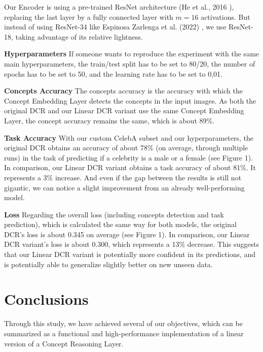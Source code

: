 \documentclass[sigconf, nonacm]{acmart}
\begin{document}
Our Encoder is using a pre-trained ResNet architecture (He et al., 2016 \cite{he2016residuallearning}), replacing the last layer by a fully connected layer with \( m = 16 \) activations. But instead of using ResNet-34 like Espinosa Zarlenga et al. (2022) \cite{espinosa2022concept}, we use ResNet-18, taking advantage of its relative lightness. \vspace{8pt}

\textbf{Hyperparameters} If someone wants to reproduce the experiment with the same main hyperparameters, the train/test split has to be set to 80/20, the number of epochs has to be set to 50, and the learning rate has to be set to 0,01. \vspace{8pt}

\textbf{Concepts Accuracy} The concepts accuracy is the accuracy with which the Concept Embedding Layer detects the concepts in the input images. As both the original DCR and our Linear DCR variant use the same Concept Embedding Layer, the concept accuracy remains the same, which is about 89\%. \vspace{8pt}

\textbf{Task Accuracy} With our custom CelebA subset and our hyperparameters, the original DCR obtains an accuracy of about 78\% (on average, through multiple runs) in the task of predicting if a celebrity is a male or a female (see Figure 1). In comparison, our Linear DCR variant obtains a task accuracy of about 81\%. It represents a 3\% increase. And even if the gap between the results is still not gigantic, we can notice a slight improvement from an already well-performing model. \vspace{8pt}

\textbf{Loss} Regarding the overall loss (including concepts detection and task prediction), which is calculated the same way for both models, the original DCR's loss is about 0.345 on average (see Figure 1). In comparison, our Linear DCR variant's loss is about 0.300, which represents a 13\% decrease. This suggests that our Linear DCR variant is potentially more confident in its predictions, and is potentially able to generalize slightly better on new unseen data.  \vspace{8pt}


\section{Conclusions}
\vspace{2pt}
Through this study, we have achieved several of our objectives, which can be summarized as a functional and high-performance implementation of a linear version of a Concept Reasoning Layer.
\end{document}
